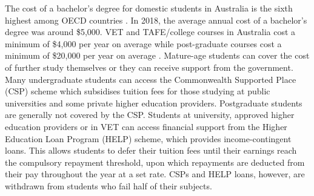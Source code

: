 \documentclass[12pt, a4paper]{article}
\begin{document}
%

The cost of a bachelor’s degree for domestic students in Australia is the sixth highest among OECD countries \citep{ua2020}. In 2018, the average annual cost of a bachelor’s degree was around \$5,000. VET and TAFE/college courses in Australia cost a minimum of \$4,000 per year on average while post-graduate courses cost a minimum of \$20,000 per year on average \citep{studies2018}. Mature-age students can cover the cost of further study themselves or they can receive support from the government. Many undergraduate students can access the Commonwealth Supported Place (CSP) scheme which subsidises tuition fees for those studying at public universities and some private higher education providers. Postgraduate students are generally not covered by the CSP. Students at university, approved higher education providers or in VET can access financial support from the Higher Education Loan Program (HELP) scheme, which provides income-contingent loans. This allows students to defer their tuition fees until their earnings reach the compulsory repayment threshold, upon which repayments are deducted from their pay throughout the year at a set rate. CSPs and HELP loans, however, are withdrawn from students who fail half of their subjects.
\end{document}
